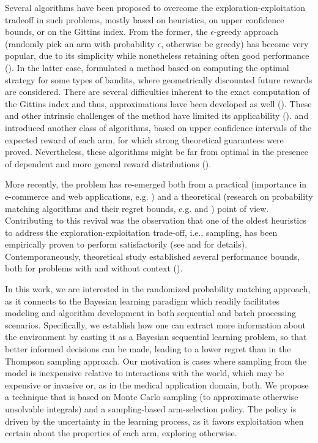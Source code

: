 \documentclass{article}
\newcommand{\ie}{i.e., }
\newcommand{\eg}{e.g. }
\begin{document}
Several algorithms have been proposed to overcome the exploration-exploitation tradeoff in such problems, mostly based on heuristics, on upper confidence bounds, or on the Gittins index. From the former, the $\epsilon$-greedy approach (randomly pick an arm with probability $\epsilon$, otherwise be greedy) has become very popular, due to its simplicity 
while nonetheless retaining often good performance (\cite{j-Auer2002}). In the latter case, \cite{j-Gittins1979} formulated a method based on computing the optimal strategy for some types of bandits, where geometrically discounted future rewards are considered. There are several difficulties inherent to the exact computation of the Gittins index and thus, approximations have been developed as well (\cite{j-Brezzi2002}). These and other intrinsic challenges of the method have limited its applicability (\cite{b-Sutton1998}). \cite{j-Lai1985} and \cite{j-Lai1987} introduced another class of algorithms, based on upper confidence intervals of the expected reward of each arm, for which strong theoretical guarantees were proved. Nevertheless, these algorithms might be far from optimal in the presence of dependent and more general reward distributions (\cite{j-Scott2010}).

More recently, the problem has re-emerged both from a practical (importance in e-commerce and web applications, \eg \cite{j-Li2010}) and a theoretical (research on probability matching algorithms and their regret bounds, \eg \cite{j-Agrawal2011} and \cite{ip-Maillard2011}) point of view. Contributing to this revival was the observation that
one of the oldest heuristics to address the exploration-exploitation trade-off, \ie \cite{j-Thompson1935,j-Thompson1933} sampling, has been empirically proven to perform satisfactorily (see \cite{ic-Chapelle2011} and \cite{j-Scott2015} for details). Contemporaneously, theoretical study established several performance bounds, both for problems with and without context (\cite{j-Agrawal2012,j-Agrawal2012a,ic-Korda2013,j-Russo2014,j-Russo2016}).

In this work, we are interested in the randomized probability matching approach, as it connects to the Bayesian learning paradigm which readily facilitates modeling and algorithm development in both sequential and batch processing scenarios. Specifically, we establish how one can extract more information about the environment by casting it as a Bayesian sequential learning problem, so that better informed decisions can be made, leading to a lower regret than in the Thompson sampling approach. Our motivation is cases where sampling from the model is inexpensive relative to interactions with the world, which may be expensive or invasive or, as in the medical application domain, both. We propose a technique that is based on Monte Carlo sampling (to approximate otherwise unsolvable integrals) and a sampling-based arm-selection policy. The policy is driven by the uncertainty in the learning process, as it favors exploitation when certain about the properties of each arm, exploring otherwise.
\end{document}
